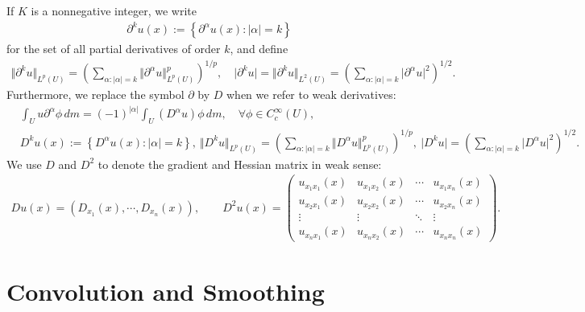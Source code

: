 \documentclass{article}
\numberwithin{equation}{section}
\theoremstyle{plain}
\theoremstyle{definition}
\begin{document}
If $K$ is a nonnegative integer, we write
\begin{align*}
	\partial^k u(x) := \left\{\partial^\alpha u(x):\vert\alpha\vert =k\right\}
\end{align*}
for the set of all partial derivatives of order $k$, and define
\begin{align*}
	\Vert \partial^k u\Vert_{L^p(U)} = \left(\sum_{\alpha:\vert\alpha\vert=k}\Vert \partial^\alpha u\Vert^p_{L^p(U)}\right)^{1/p},\quad\vert \partial^k u\vert =\Vert \partial^k u\Vert_{L^2(U)} = \left(\sum_{\alpha:\vert\alpha\vert=k}\vert \partial^\alpha u\vert^2\right)^{1/2}.
\end{align*}
Furthermore, we replace the symbol $\partial$ by $D$ when we refer to weak derivatives:
\begin{align*}
	&\int_U u\partial^\alpha\phi\,dm=(-1)^{\vert\alpha\vert}\int_U (D^\alpha u)\phi\,dm,\quad\forall\phi\in C_c^\infty(U),\\
	&D^k u(x) := \left\{D^\alpha u(x):\vert\alpha\vert =k\right\},\ \Vert D^k u\Vert_{L^p(U)} = \left(\sum_{\alpha:\vert\alpha\vert=k}\Vert D^\alpha u\Vert^p_{L^p(U)}\right)^{1/p},\ \vert D^k u\vert= \left(\sum_{\alpha:\vert\alpha\vert=k}\vert D^\alpha u\vert^2\right)^{1/2}.
\end{align*}
We use $D$ and $D^2$ to denote the gradient and Hessian matrix in weak sense:
\begin{align*}
	Du(x)=\left(D_{x_1}(x),\cdots,D_{x_n}(x)\right),\qquad D^2 u(x)=\begin{pmatrix}
	u_{x_1x_1}(x) & u_{x_1x_2}(x) & \cdots & u_{x_1x_n}(x)\\
	u_{x_2x_1}(x) & u_{x_2x_2}(x) & \cdots & u_{x_2x_n}(x)\\
	\vdots & \vdots & \ddots & \vdots \\
	u_{x_nx_1}(x) & u_{x_nx_2}(x) & \cdots & u_{x_nx_n}(x)
\end{pmatrix}.
\end{align*}


\newpage
\section{Convolution and Smoothing}
\end{document}
